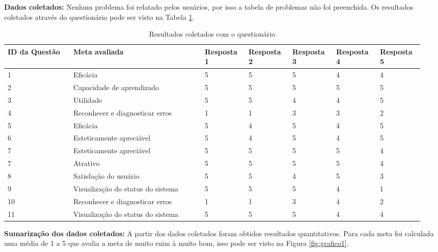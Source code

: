   \textbf{Dados coletados:}
   Nenhum problema foi relatado pelos usuários, por isso a tabela de problemas não foi preenchida. Os resultados coletados
   através do questionário pode ser visto na Tabela \ref{tab:resultados1}.
   
\begin{table}[!h]
  \caption{Resultados coletados com o questionário}
  \label{tab:resultados1}
    \begin{tabular}{p{0.15\linewidth}p{0.30\linewidth}p{0.10\linewidth}p{0.10\linewidth}p{0.10\linewidth}p{0.10\linewidth}p{0.10\linewidth}}
  \hline
    ID da Questão & Meta avaliada & Resposta 1 & Resposta 2 & Resposta 3 & Resposta 4 & Resposta 5\\
  \hline
    1&Eficácia & 5 & 5 & 5 & 4 & 4\\
    2&Capacidade de aprendizado& 5 & 5 & 5 & 5 & 5 \\
    3&Utilidade& 5 & 5 & 4 &4 & 5 \\
    4&Reconhecer e diagnosticar erros& 1&1& 3& 3& 2\\
    5&Eficácia & 5 &4& 5 &4 & 5 \\
    6&Esteticamente apreciável & 5 &4 & 5 & 4 & 5\\
    7&Esteticamente apreciável & 5 & 5 & 5 & 5 &4\\
    7& Atrativo	& 5 & 5 & 5 & 5 &4\\
    8&Satisfação do usuário & 5 & 5 & 4 & 5 & 3\\
    9&Visualização do status do sistema	& 5 & 5 & 5 & 4 &1\\
    10&Reconhecer e diagnosticar erros	&1& 1& 3& 4 &2\\
    11&Visualização do status do sistema & 5 & 5 & 5 & 4&4\\

  \end{tabular}
\end{table}

  \textbf{Sumarização dos dados coletados:}
    A partir dos dados coletados foram obtidos resultados quantitativos. Para cada meta foi calculada uma média de 1 a 5 que avalia a meta
  de muito ruim à muito bom, isso pode ser visto na Figura \ref{fig:grafico1}.
  
